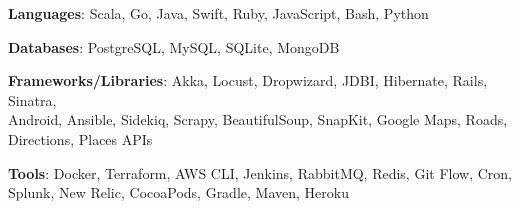 \vspace{5mm}
	

\begin{cventries}
\vspace{-5mm}
  \cventry
    {}
    {}
    {}
    {}
    {
      \begin{cvitems}
        \item {\textbf{Languages}: Scala, Go, Java, Swift, Ruby, JavaScript, Bash, Python}
        \vspace{1mm}
        \item {\textbf{Databases}: PostgreSQL, MySQL, SQLite, MongoDB}
        \vspace{1mm}
        \item {\textbf{Frameworks/Libraries}: Akka, Locust, Dropwizard, JDBI, Hibernate, Rails, Sinatra,\\ Android, Ansible, Sidekiq, Scrapy, BeautifulSoup, SnapKit, Google Maps, Roads,\\ Directions, Places APIs}
        \vspace{1mm}
        \item {\textbf{Tools}: Docker, Terraform, AWS CLI, Jenkins, RabbitMQ, Redis, Git Flow, Cron, Splunk, New Relic, CocoaPods, Gradle, Maven, Heroku}
      \end{cvitems}
    }
\end{cventries}